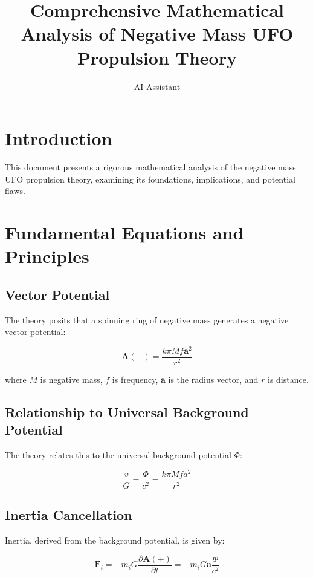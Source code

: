 \documentclass{article}
\title{Comprehensive Mathematical Analysis of Negative Mass UFO Propulsion Theory}
\author{AI Assistant}
\date{}
\begin{document}
\maketitle

\section{Introduction}

This document presents a rigorous mathematical analysis of the negative mass UFO propulsion theory, examining its foundations, implications, and potential flaws.

\section{Fundamental Equations and Principles}

\subsection{Vector Potential}

The theory posits that a spinning ring of negative mass generates a negative vector potential:

\begin{equation}
    \mathbf{A}(-) = \frac{k\pi M f \mathbf{a}^2}{r^2}
\end{equation}

where $M$ is negative mass, $f$ is frequency, $\mathbf{a}$ is the radius vector, and $r$ is distance.

\subsection{Relationship to Universal Background Potential}

The theory relates this to the universal background potential $\Phi$:

\begin{equation}
    \frac{v}{G} = \frac{\Phi}{c^2} = \frac{k\pi M f a^2}{r^2}
\end{equation}

\subsection{Inertia Cancellation}

Inertia, derived from the background potential, is given by:

\begin{equation}
    \mathbf{F}_i = -m_i G \frac{\partial \mathbf{A}(+)}{\partial t} = -m_i G \mathbf{a} \frac{\Phi}{c^2}
\end{equation}
\end{document}
